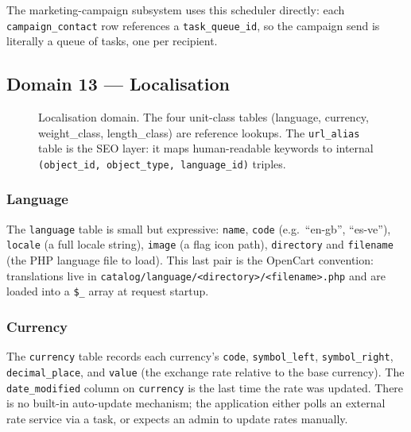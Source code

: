 \documentclass[11pt,a4paper]{article}
\begin{document}
The marketing-campaign subsystem uses this scheduler directly:
each \texttt{campaign\_contact} row references a
\texttt{task\_queue\_id}, so the campaign send is literally a
queue of tasks, one per recipient.

\subsection{Domain 13 --- Localisation}\label{sec:l10n}

\begin{figure}[htbp]
\centering
{}
\caption{Localisation domain. The four unit-class tables
(language, currency, weight\_class, length\_class) are
reference lookups. The \texttt{url\_alias} table is the SEO
layer: it maps human-readable keywords to internal
\texttt{(object\_id, object\_type, language\_id)} triples.}
\label{fig:l10n}
\end{figure}

\subsubsection{Language}

The \texttt{language} table is small but expressive:
\texttt{name}, \texttt{code} (e.g.\ ``en-gb'', ``es-ve''),
\texttt{locale} (a full locale string), \texttt{image} (a
flag icon path), \texttt{directory} and \texttt{filename}
(the PHP language file to load). This last pair is the
OpenCart convention: translations live in
\texttt{catalog/language/<directory>/<filename>.php} and are
loaded into a \texttt{\$\_} array at request startup.

\subsubsection{Currency}

The \texttt{currency} table records each currency's
\texttt{code}, \texttt{symbol\_left}, \texttt{symbol\_right},
\texttt{decimal\_place}, and \texttt{value} (the exchange
rate relative to the base currency). The
\texttt{date\_modified} column on \texttt{currency} is the
last time the rate was updated. There is no built-in
auto-update mechanism; the application either polls an
external rate service via a task, or expects an admin to
update rates manually.
\end{document}
